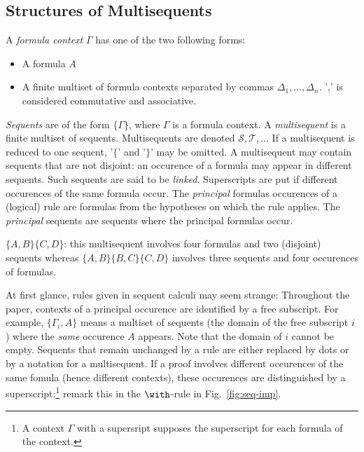 \documentclass{llncs}
\begin{document}
\subsection{Structures of Multisequents}
\begin{definition}
A {\em formula context} $\Gamma$ has one of the two following forms:
\begin{itemize}
\item A formula $A$
\item A finite multiset of formula contexts separated by commas $\Delta_1, \dots, 
\Delta_n$.
',' is considered commutative and associative.
\end{itemize}
{\em Sequents} are of the form $\{\Gamma\}$, where $\Gamma$ is a formula context.
A {\em multisequent} is a finite multiset of sequents. 
Multisequents are denoted $\mathcal S, \mathcal T, \dots$ If a multisequent is reduced to one sequent, '$\{$' and '$\}$' may be omitted.
A multisequent may contain sequents that are not disjoint: an occurence of a formula may appear in different sequents. Such sequents
are said to be {\em linked}. Superscripts are put if different occurences of the same formula occur.
The {\em principal} formulas occurences of a (logical) rule are formulas from the hypotheses on which the rule applies. The {\em principal} sequents are sequents where the principal formulas occur.
\end{definition}

\begin{example}[multisequents]
$\{A,B\}\{C,D\}$: this multisequent involves four formulas and two (disjoint) sequents whereas
$\{A,B\}\{B,C\}\{C,D\}$ involves three sequents and four occurences of formulas. \end{example}

At first glance, rules given in sequent calculi may seem strange:
Throughout the paper, contexts of a principal occurence are identified by a free subscript. For example, 
$\{\Gamma_i, A\}$ means a multiset of sequents (the domain of the free subscript $i$) where the
{\em same} occurence $A$ appears. Note that the domain of $i$ cannot be empty.
Sequents that remain unchanged by a rule are either replaced by dots or by a notation for a multisequent. 
If a proof involves different occurences
of the same fomula (hence different contexts), these occurences are distinguished by a superscript:\footnote{A context $\Gamma$ with a supersript supposes the superscript for
each formula of the context.} remark this in the $\with$-rule in Fig.~\ref{fig:seq-imp}.
\end{document}
